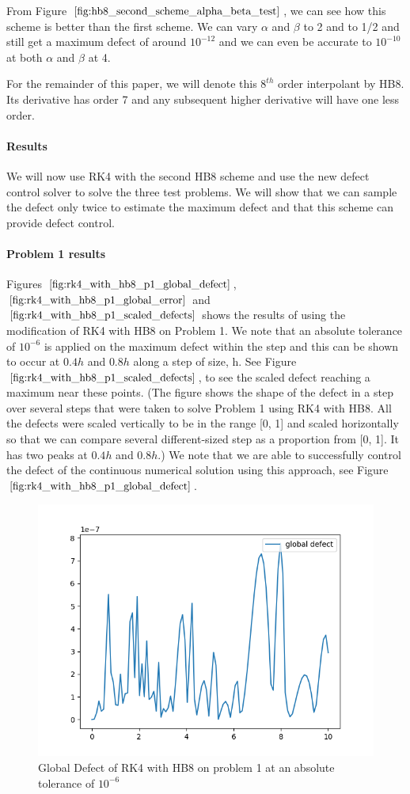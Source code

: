 \documentclass{article}
\begin{document}
From Figure $\ref{fig:hb8_second_scheme_alpha_beta_test}$, we can see how this scheme is better than the first scheme. We can vary $\alpha$ and $\beta$ to 2 and to 1/2 and still get a maximum defect of around $10^{-12}$ and we can even be accurate to $10^{-10}$ at both $\alpha$ and $\beta$ at 4. 

For the remainder of this paper, we will denote this $8^{th}$ order interpolant by HB8. Its derivative has order 7 and any subsequent higher derivative will have one less order.

\paragraph{Results}
We will now use RK4 with the second HB8 scheme and use the new defect control solver to solve the three test problems. We will show that we can sample the defect only twice to estimate the maximum defect and that this scheme can provide defect control.

\paragraph{Problem 1 results}
Figures $\ref{fig:rk4_with_hb8_p1_global_defect}$, $\ref{fig:rk4_with_hb8_p1_global_error}$ and $\ref{fig:rk4_with_hb8_p1_scaled_defects}$ shows the results of using the modification of RK4 with HB8 on Problem 1. We note that an absolute tolerance of $10^{-6}$ is applied on the maximum defect within the step and this can be shown to occur at $0.4h$ and $0.8h$ along a step of size, h. See Figure $\ref{fig:rk4_with_hb8_p1_scaled_defects}$, to see the scaled defect reaching a maximum near these points. (The figure shows the shape of the defect in a step over several steps that were taken to solve Problem 1 using RK4 with HB8. All the defects were scaled vertically to be in the range [0, 1] and scaled horizontally so that we can compare several different-sized step as a proportion from [0, 1]. It has two peaks at $0.4h$ and $0.8h$.) We note that we are able to successfully control the defect of the continuous numerical solution using this approach, see Figure $\ref{fig:rk4_with_hb8_p1_global_defect}$. 

\begin{figure}[H]
\centering
\includegraphics[width=0.7\linewidth]{./figures/rk4_with_hb8_p1_global_defect}
\caption{Global Defect of RK4 with HB8 on problem 1 at an absolute tolerance of $10^{-6}$}
\label{fig:rk4_with_hb8_p1_global_defect}
\end{figure}
\end{document}
